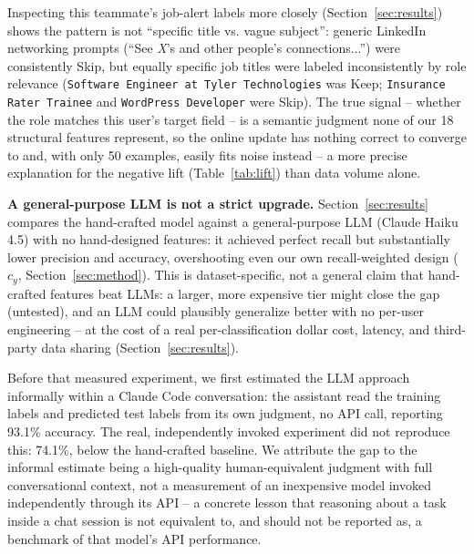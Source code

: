 \documentclass[twoside,twocolumn,10pt]{article}
\begin{document}
Inspecting this teammate's job-alert labels more closely (Section~\ref{sec:results}) shows the pattern is not ``specific title vs. vague subject'': generic LinkedIn networking prompts (``See \emph{X}'s and other people's connections...'') were consistently Skip, but equally specific job titles were labeled inconsistently by role relevance (\texttt{Software Engineer at Tyler Technologies} was Keep; \texttt{Insurance Rater Trainee} and \texttt{WordPress Developer} were Skip). The true signal -- whether the role matches this user's target field -- is a semantic judgment none of our 18 structural features represent, so the online update has nothing correct to converge to and, with only 50 examples, easily fits noise instead -- a more precise explanation for the negative lift (Table~\ref{tab:lift}) than data volume alone.

\textbf{A general-purpose LLM is not a strict upgrade.} Section~\ref{sec:results} compares the hand-crafted model against a general-purpose LLM (Claude Haiku 4.5) with no hand-designed features: it achieved perfect recall but substantially lower precision and accuracy, overshooting even our own recall-weighted design ($c_y$, Section~\ref{sec:method}). This is dataset-specific, not a general claim that hand-crafted features beat LLMs: a larger, more expensive tier might close the gap (untested), and an LLM could plausibly generalize better with no per-user engineering -- at the cost of a real per-classification dollar cost, latency, and third-party data sharing (Section~\ref{sec:results}).

Before that measured experiment, we first estimated the LLM approach informally within a Claude Code conversation: the assistant read the training labels and predicted test labels from its own judgment, no API call, reporting 93.1\% accuracy. The real, independently invoked experiment did not reproduce this: 74.1\%, below the hand-crafted baseline. We attribute the gap to the informal estimate being a high-quality human-equivalent judgment with full conversational context, not a measurement of an inexpensive model invoked independently through its API -- a concrete lesson that reasoning about a task inside a chat session is not equivalent to, and should not be reported as, a benchmark of that model's API performance.
\end{document}
